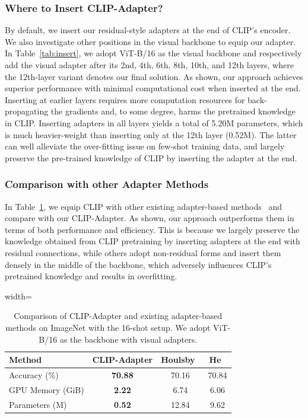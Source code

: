 \documentclass[default,iicol]{sn-jnl}%
\theoremstyle{thmstyleone}%
\theoremstyle{thmstyletwo}%
\theoremstyle{thmstylethree}%
\begin{document}
\subsubsection{Where to Insert CLIP-Adapter?}
\label{sec:insert-adapter}
By default, we insert our residual-style adapters at the end of CLIP's encoder. We also investigate other positions in the visual backbone to equip our adapter. In Table~\ref{tab:insert}, we adopt ViT-B/16 as the visual backbone and respectively add the visual adapter after its 2nd, 4th, 6th, 8th, 10th, and 12th layers, where the 12th-layer variant denotes our final solution. As shown, our approach achieves superior performance with minimal computational cost when inserted at the end. Inserting at earlier layers requires more computation resources for back-propagating the gradients and, to some degree, harms the pretrained knowledge in CLIP. Inserting adapters in all layers yields a total of 5.20M parameters, which is much heavier-weight than inserting only at the 12th layer (0.52M). The latter can well alleviate the over-fitting issue on few-shot training data, and largely preserve the pre-trained knowledge of CLIP by inserting the adapter at the end.


\subsubsection{Comparison with other Adapter Methods}
\label{sec:other-adapter}
In Table~\ref{other-adapter}, we equip CLIP with other existing adapter-based methods~\cite{houlsby2019parameter,he2022towards} and compare with our CLIP-Adapter. As shown, our approach outperforms them in terms of both performance and efficiency. This is because we largely preserve the knowledge obtained from CLIP pretraining by inserting adapters at the end with residual connections, while others adopt non-residual forms and insert them densely in the middle of the backbone, which adversely influences CLIP's pretrained knowledge and results in overfitting.


\begin{table}[t!]
\centering
\caption{Comparison of CLIP-Adapter and existing adapter-based methods on ImageNet with the 16-shot setup. We adopt ViT-B/16 as the backbone with visual adapters.}
\vspace*{6pt}
\begin{adjustbox}{width=\linewidth}
	\begin{tabular}{lccc}
	\toprule
		Method &  CLIP-Adapter  &  Houlsby~\cite{houlsby2019parameter}  &  He~\cite{he2022towards}  \\
		\midrule
		Accuracy (\%)  & \textbf{70.88}		&70.16				&70.84 \\
  GPU Memory (GiB) &\textbf{2.22}			&6.74				&6.06\\
  Parameters (M) &\textbf{0.52}			&12.84				&9.62\\
	\bottomrule
	\end{tabular}
\end{adjustbox}
\label{other-adapter}
\end{table}
\end{document}
